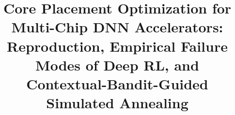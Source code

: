 \documentclass[10pt,conference]{IEEEtran}
\begin{document}

\title{Core Placement Optimization for Multi-Chip DNN Accelerators: Reproduction, Empirical Failure Modes of Deep RL, and Contextual-Bandit-Guided Simulated Annealing}

\author{
}

\maketitle

\end{document}
